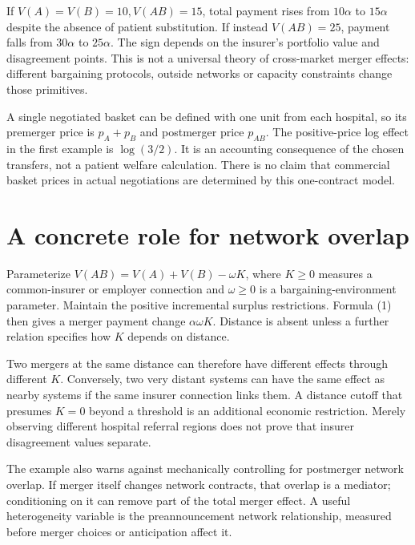 \documentclass[11pt,a4paper]{article}
\begin{document}
If $V(A)=V(B)=10,V(AB)=15$, total payment rises from $10\alpha$ to $15\alpha$ despite the absence of patient substitution. If instead $V(AB)=25$, payment falls from $30\alpha$ to $25\alpha$. The sign depends on the insurer's portfolio value and disagreement points. This is not a universal theory of cross-market merger effects: different bargaining protocols, outside networks or capacity constraints change those primitives.

A single negotiated basket can be defined with one unit from each hospital, so its premerger price is $p_A+p_B$ and postmerger price $p_{AB}$. The positive-price log effect in the first example is $\log(3/2)$. It is an accounting consequence of the chosen transfers, not a patient welfare calculation. There is no claim that commercial basket prices in actual negotiations are determined by this one-contract model.

\section{A concrete role for network overlap}
Parameterize $V(AB)=V(A)+V(B)-\omega K$, where $K\ge0$ measures a common-insurer or employer connection and $\omega\ge0$ is a bargaining-environment parameter. Maintain the positive incremental surplus restrictions. Formula (1) then gives a merger payment change $\alpha\omega K$. Distance is absent unless a further relation specifies how $K$ depends on distance.

Two mergers at the same distance can therefore have different effects through different $K$. Conversely, two very distant systems can have the same effect as nearby systems if the same insurer connection links them. A distance cutoff that presumes $K=0$ beyond a threshold is an additional economic restriction. Merely observing different hospital referral regions does not prove that insurer disagreement values separate.

The example also warns against mechanically controlling for postmerger network overlap. If merger itself changes network contracts, that overlap is a mediator; conditioning on it can remove part of the total merger effect. A useful heterogeneity variable is the preannouncement network relationship, measured before merger choices or anticipation affect it.
\end{document}
